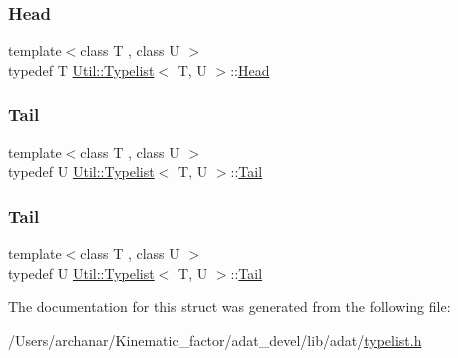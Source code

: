 \subsubsection{\texorpdfstring{Head}{Head}\hspace{0.1cm}{\footnotesize\ttfamily [2/2]}}
{\footnotesize\ttfamily template$<$class T , class U $>$ \\
typedef T \mbox{\hyperlink{structUtil_1_1Typelist}{Util\+::\+Typelist}}$<$ T, U $>$\+::\mbox{\hyperlink{structUtil_1_1Typelist_adc631e8685518837efd57d234d33982e}{Head}}}

\mbox{\label{structUtil_1_1Typelist_a9c02512c1b76c9340e36855f76ff5f01}} 
\subsubsection{\texorpdfstring{Tail}{Tail}\hspace{0.1cm}{\footnotesize\ttfamily [1/2]}}
{\footnotesize\ttfamily template$<$class T , class U $>$ \\
typedef U \mbox{\hyperlink{structUtil_1_1Typelist}{Util\+::\+Typelist}}$<$ T, U $>$\+::\mbox{\hyperlink{structUtil_1_1Typelist_a9c02512c1b76c9340e36855f76ff5f01}{Tail}}}

\mbox{\label{structUtil_1_1Typelist_a9c02512c1b76c9340e36855f76ff5f01}} 
\subsubsection{\texorpdfstring{Tail}{Tail}\hspace{0.1cm}{\footnotesize\ttfamily [2/2]}}
{\footnotesize\ttfamily template$<$class T , class U $>$ \\
typedef U \mbox{\hyperlink{structUtil_1_1Typelist}{Util\+::\+Typelist}}$<$ T, U $>$\+::\mbox{\hyperlink{structUtil_1_1Typelist_a9c02512c1b76c9340e36855f76ff5f01}{Tail}}}



The documentation for this struct was generated from the following file\+:\begin{DoxyCompactItemize}
\item 
/\+Users/archanar/\+Kinematic\+\_\+factor/adat\+\_\+devel/lib/adat/\mbox{\hyperlink{lib_2adat_2typelist_8h}{typelist.\+h}}\end{DoxyCompactItemize}
